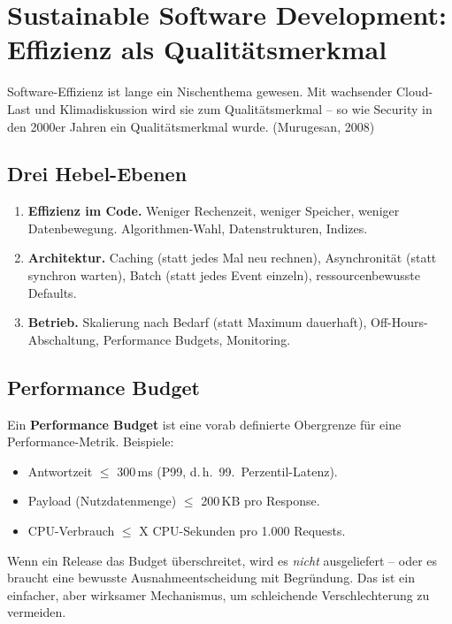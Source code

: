 \documentclass[11pt,a4paper,oneside]{article}
\newcommand{\fachbegriff}[1]{\textbf{#1}}
\newcommand{\quelle}[1]{{\footnotesize\color{lpGray}(#1)}}
\begin{document}
\section{Sustainable Software Development: Effizienz als Qualitätsmerkmal}

Software-Effizienz ist lange ein Nischenthema gewesen. Mit wachsender Cloud-Last und Klimadiskussion wird sie zum Qualitätsmerkmal -- so wie Security in den 2000er Jahren ein Qualitätsmerkmal wurde. \quelle{Murugesan, 2008}

\subsection{Drei Hebel-Ebenen}

\begin{enumerate}
  \item \fachbegriff{Effizienz im Code.} Weniger Rechenzeit, weniger Speicher, weniger Datenbewegung. Algorithmen-Wahl, Datenstrukturen, Indizes.
  \item \fachbegriff{Architektur.} Caching (statt jedes Mal neu rechnen), Asynchronität (statt synchron warten), Batch (statt jedes Event einzeln), ressourcenbewusste Defaults.
  \item \fachbegriff{Betrieb.} Skalierung nach Bedarf (statt Maximum dauerhaft), Off-Hours-Abschaltung, Performance Budgets, Monitoring.
\end{enumerate}

\subsection{Performance Budget}

Ein \fachbegriff{Performance Budget} ist eine vorab definierte Obergrenze für eine Performance-Metrik. Beispiele:

\begin{itemize}
  \item Antwortzeit $\leq$ 300\,ms (P99, d.\,h.\ 99.\ Perzentil-Latenz).
  \item Payload (Nutzdatenmenge) $\leq$ 200\,KB pro Response.
  \item CPU-Verbrauch $\leq$ X CPU-Sekunden pro 1.000 Requests.
\end{itemize}

Wenn ein Release das Budget überschreitet, wird es \emph{nicht} ausgeliefert -- oder es braucht eine bewusste Ausnahmeentscheidung mit Begründung. Das ist ein einfacher, aber wirksamer Mechanismus, um schleichende Verschlechterung zu vermeiden.
\end{document}
